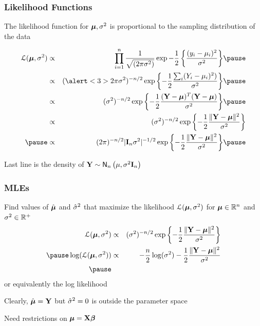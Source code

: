 \documentclass[handout]{beamer}
\begin{document}
\begin{frame} \frametitle{Likelihood Functions}

The likelihood function for $\boldsymbol{\mu}, \sigma^2$ is proportional to the
sampling distribution of the data \pause

\begin{eqnarray*}
 \cL(\mub, \sigma^2) & \propto & \prod_{i = 1}^n \frac{1}{\sqrt{(2 \pi
                                 \sigma^2)}} \exp{- \frac{1}{2}\left\{ \frac{( y_i
                                 - \mu_i)^2}{\sigma^2} \right\}}
                                 \pause \\
 & \propto & (\alert<3>{2 \pi} \sigma^2)^{-n/2}
 \exp{\left\{ - \frac 1 2  \frac{ \sum_i(Y_i - \mu_i)^2 )}{\sigma^2}
\right\}}  \pause \\
 & \propto & ( \sigma^2)^{-n/2}
 \exp{\left\{ - \frac 1 2 \frac{(\Y - \mub)^T (\Y - \mub)}{\sigma^2}
\right\}}  \pause \\
   & \propto & (\sigma^2)^{-n/2}
 \exp{\left\{ - \frac 1 2 \frac{\| \Y - \mub \|^2}{\sigma^2}
\right\}} \\ \pause
  & \propto &  (2 \pi)^{-n/2}
| \I_n\sigma^2|^{-1/2}
 \exp{\left\{ - \frac 1 2 \frac{\| \Y - \mub \|^2}{\sigma^2}
\right\}}  \pause
\end{eqnarray*}

Last line is the density of $\mathbf{Y} \sim \textsf{N}_n\left(\mu, \sigma^2 \mathbf{I}_n\right)$
\end{frame}

\begin{frame} \frametitle{MLEs}

Find values of $\hat{\boldsymbol{\mu}}$ and ${\hat{\sigma}}^2$ that maximize the likelihood
${\cal{L}}(\boldsymbol{\mu}, \sigma^2)$ for $\boldsymbol{\mu} \in \mathbb{R}^n$ and $\sigma^2 \in \mathbb{R}^+$
\pause
  \begin{eqnarray*}
 \cL(\mub, \sigma^2)
    & \propto & (\sigma^2)^{-n/2}
 \exp{\left\{ - \frac 1 2 \frac{\| \Y - \mub \|^2}{\sigma^2}
\right\}} \\ \pause
 \log(\cL(\mub, \sigma^2) )
   & \propto & -\frac{n}{2} \log(\sigma^2)  - \frac 1 2 \frac{\| \Y - \mub \|^2}{\sigma^2}
 \\ \pause
\end{eqnarray*}
or equivalently the log likelihood


\vspace{18pt}
Clearly, $\hat{\boldsymbol{\mu}} = \mathbf{Y}$ but ${\hat{\sigma}}^2 = 0$  is outside the parameter space
\vspace{18pt}

Need restrictions on $\boldsymbol{\mu} = \mathbf{X}\boldsymbol{\beta}$

\end{frame}
\end{document}
